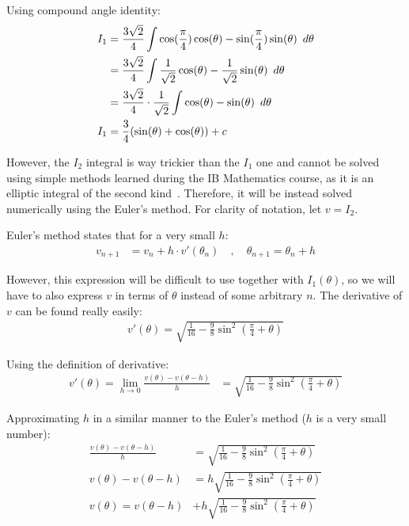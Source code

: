 \documentclass[12pt]{article}
\newcommand{\Hquad}{\hspace{0.5em}}
\begin{document}
        Using compound angle identity:
        \begin{align}
            I_1 &= \frac{3\sqrt{2}}{4} \int \cos (\frac{\pi}{4}) \cos(\theta) - \sin(\frac{\pi}{4}) \sin(\theta) \Hquad d\theta \\
            &= \frac{3\sqrt{2}}{4} \int \frac{1}{\sqrt{2}} \cos(\theta) - \frac{1}{\sqrt{2}} \sin(\theta) \Hquad d\theta \\
            &= \frac{3\sqrt{2}}{4} \cdot \frac{1}{\sqrt{2}} \int \cos(\theta) - \sin(\theta) \Hquad d\theta \\
            I_1 &= \frac{3}{4} (\sin(\theta) + \cos(\theta)) + c
        \end{align}

        However, the $I_2$ integral is way trickier than the $I_1$ one and cannot be solved using simple methods learned during the IB Mathematics course, as it is an elliptic integral of the second kind~\cite{elliptic_integral}. Therefore, it will be instead solved numerically using the Euler's method. For clarity of notation, let $v = I_2$.

        Euler's method states that for a very small $h$:
        \begin{align}
            v_{n+1} &= v_n + h \cdot v'(\theta_n) \quad , \quad
            \theta_{n+1} = \theta_n +h
        \end{align}

        However, this expression will be difficult to use together with $I_1(\theta)$, so we will have to also express $v$ in terms of $\theta$ instead of some arbitrary $n$. The derivative of $v$ can be found really easily:
        \begin{align}
            v'(\theta) = \sqrt{\frac{1}{16} - \frac{9}{8} \sin^2 (\frac{\pi}{4}+\theta)}
        \end{align}

        Using the definition of derivative:
        \begin{align}
            v'(\theta) = \lim\limits_{h \to 0} \frac{v(\theta)-v(\theta-h)}{h} &= \sqrt{\frac{1}{16} - \frac{9}{8} \sin^2 (\frac{\pi}{4}+\theta)}
        \end{align}

        Approximating $h$ in a similar manner to the Euler's method ($h$ is a very small number):
        \begin{align}
            \frac{v(\theta)-v(\theta-h)}{h} &= \sqrt{\frac{1}{16} - \frac{9}{8} \sin^2 (\frac{\pi}{4}+\theta)} \\
            v(\theta)-v(\theta-h) &= h \sqrt{\frac{1}{16} - \frac{9}{8} \sin^2 (\frac{\pi}{4}+\theta)} \\
            v(\theta) = v(\theta-h) &+ h \sqrt{\frac{1}{16} - \frac{9}{8} \sin^2 (\frac{\pi}{4}+\theta)}
        \end{align}
\end{document}
